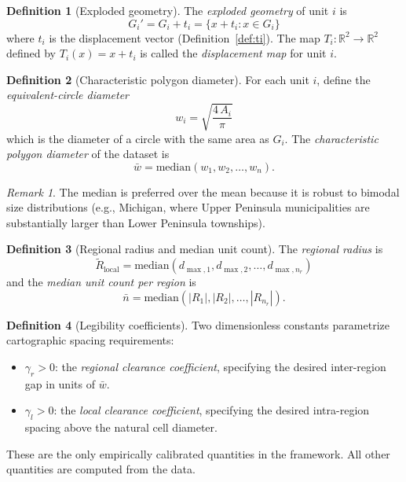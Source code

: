\documentclass[12pt, a4paper]{article}
\numberwithin{equation}{section}
\theoremstyle{definition}
\newtheorem{definition}{Definition}[section]
\theoremstyle{plain}
\theoremstyle{remark}
\newtheorem*{remark}{Remark}
\newcommand{\R}{\mathbb{R}}
\begin{document}
\begin{definition}[Exploded geometry]
\label{def:exploded}
The \emph{exploded geometry} of unit $i$ is
\begin{equation}
  G_i' = G_i + t_i = \{x + t_i : x \in G_i\}
  \label{eq:exploded}
\end{equation}
where $t_i$ is the displacement vector (Definition~\ref{def:ti}). The map $T_i: \R^2 \to \R^2$ defined by $T_i(x) = x + t_i$ is called the \emph{displacement map} for unit $i$.
\end{definition}

\begin{definition}[Characteristic polygon diameter]
\label{def:wbar}
For each unit $i$, define the \emph{equivalent-circle diameter}
\begin{equation}
  w_i = \sqrt{\frac{4\,A_i}{\pi}}
  \label{eq:wi}
\end{equation}
which is the diameter of a circle with the same area as $G_i$. The \emph{characteristic polygon diameter} of the dataset is
\begin{equation}
  \bar{w} = \mathrm{median}(w_1, w_2, \ldots, w_n).
  \label{eq:wbar}
\end{equation}
\end{definition}

\begin{remark}
The median is preferred over the mean because it is robust to bimodal size distributions (e.g., Michigan, where Upper Peninsula municipalities are substantially larger than Lower Peninsula townships).
\end{remark}

\begin{definition}[Regional radius and median unit count]
\label{def:rlocal}
The \emph{regional radius} is
\begin{equation}
  \widetilde{R}_{\text{local}} = \mathrm{median}(d_{\max,1}, d_{\max,2}, \ldots, d_{\max,n_r})
  \label{eq:rlocal}
\end{equation}
and the \emph{median unit count per region} is
\begin{equation}
  \bar{n} = \mathrm{median}(|R_1|, |R_2|, \ldots, |R_{n_r}|).
  \label{eq:nbar}
\end{equation}
\end{definition}

\begin{definition}[Legibility coefficients]
\label{def:gamma}
Two dimensionless constants parametrize cartographic spacing requirements:
\begin{itemize}
  \item $\gamma_r > 0$: the \emph{regional clearance coefficient}, specifying the desired inter-region gap in units of $\bar{w}$.
  \item $\gamma_l > 0$: the \emph{local clearance coefficient}, specifying the desired intra-region spacing above the natural cell diameter.
\end{itemize}
These are the only empirically calibrated quantities in the framework. All other quantities are computed from the data.
\end{definition}
\end{document}
